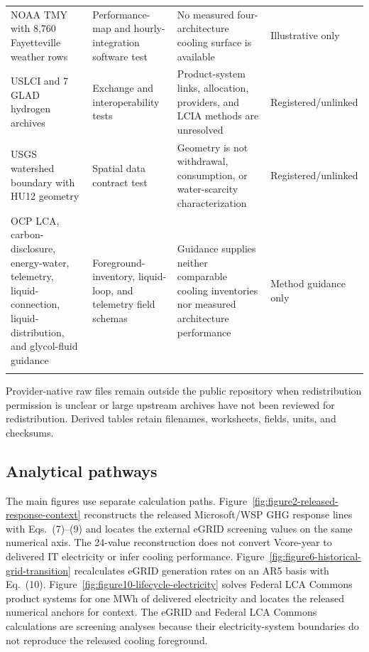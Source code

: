 \documentclass[review,a4paper,fleqn]{cas-sc}
\begin{document}
{\begin{longtable}{>{\raggedright\arraybackslash}p{}>{\raggedright\arraybackslash}p{}>{\raggedright\arraybackslash}p{}>{\raggedright\arraybackslash}p{}}
\addlinespace[2pt]
NOAA TMY with 8,760 Fayetteville weather rows \cite{ref45} & Performance-\allowbreak{}map and hourly-\allowbreak{}integration software test & No measured four-\allowbreak{}architecture cooling surface is available & Illustrative only \\
\addlinespace[2pt]
USLCI and 7 GLAD hydrogen archives \cite{ref46,ref47} & Exchange and interoperability tests & Product-\allowbreak{}system links, allocation, providers, and LCIA methods are unresolved & Registered/\allowbreak{}unlinked \\
\addlinespace[2pt]
USGS watershed boundary with HU12 geometry \cite{ref48} & Spatial data contract test & Geometry is not withdrawal, consumption, or water-\allowbreak{}scarcity characterization & Registered/\allowbreak{}unlinked \\
\addlinespace[2pt]
OCP LCA, carbon-\allowbreak{}disclosure, energy-\allowbreak{}water, telemetry, liquid-\allowbreak{}connection, liquid-\allowbreak{}distribution, and glycol-\allowbreak{}fluid guidance \cite{ref50,ref51,ref52,ref53,ref54,ref55,ref56} & Foreground-\allowbreak{}inventory, liquid-\allowbreak{}loop, and telemetry field schemas & Guidance supplies neither comparable cooling inventories nor measured architecture performance & Method guidance only \\
\addlinespace[2pt]
\end{longtable}
}

Provider-native raw files remain outside the public repository when redistribution permission is unclear or large upstream archives have not been reviewed for redistribution. Derived tables retain filenames, worksheets, fields, units, and checksums.

\subsection{Analytical pathways}
The main figures use separate calculation paths. Figure~\ref{fig:figure2-released-response-context} reconstructs the released Microsoft/WSP GHG response lines with Eqs.~(7)--(9) and locates the external eGRID screening values on the same numerical axis. The 24-value reconstruction does not convert Vcore-year to delivered IT electricity or infer cooling performance. Figure~\ref{fig:figure6-historical-grid-transition} recalculates eGRID generation rates on an AR5 basis with Eq.~(10). Figure~\ref{fig:figure10-lifecycle-electricity} solves Federal LCA Commons product systems for one MWh of delivered electricity and locates the released numerical anchors for context. The eGRID and Federal LCA Commons calculations are screening analyses because their electricity-system boundaries do not reproduce the released cooling foreground.
\end{document}

